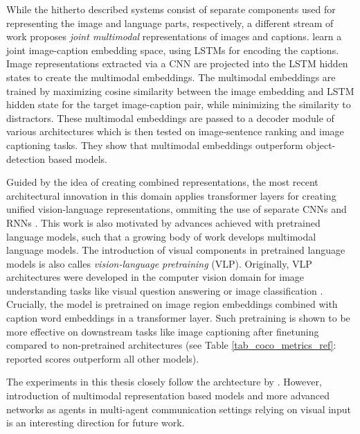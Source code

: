 While the hitherto described systems consist of separate components used for representing the image and language parts, respectively, a different stream of work proposes \textit{joint multimodal} representations of images and captions. \cite{kiros2014unifying} learn a joint image-caption embedding space, using LSTMs for encoding the captions. Image representations extracted via a CNN are projected into the LSTM hidden states to create the multimodal embeddings. The multimodal embeddings are trained by maximizing cosine similarity between the image embedding and LSTM hidden state for the target image-caption pair, while minimizing the similarity to distractors. These multimodal embeddings are passed to a decoder module of various architectures which is then tested on image-sentence ranking and image captioning tasks. They show that multimodal embeddings outperform object-detection based models.

Guided by the idea of creating combined representations, the most recent architectural innovation in this domain applies transformer layers for creating unified vision-language representations, ommiting the use of separate CNNs and RNNs \parencite{vaswani2017attention, zhou2019unified}. This work is also motivated by advances achieved with pretrained language models, such that a growing body of work develops multimodal language models. The introduction of visual components in pretrained language models is also calles \textit{vision-language pretraining} (VLP).
Originally, VLP architectures were developed in the computer vision domain for image understanding tasks like visual question answering or image classification \parencite{zhou2019unified}. Crucially, the model is pretrained on image region embeddings combined with caption word embeddings in a transformer layer. Such pretraining is shown to be more effective on downstream tasks like image captioning after finetuning compared to non-pretrained architectures (see Table \ref{tab_coco_metrics_ref}: reported scores outperform all other models). 

The experiments in this thesis closely follow the archtecture by \cite{vinyals2015show}. However, introduction of multimodal representation based models and more advanced networks as agents in multi-agent communication settings relying on visual input is an interesting direction for future work. 

